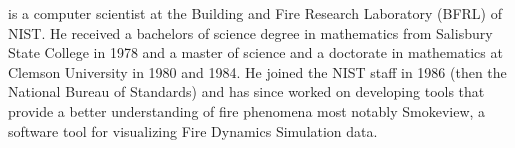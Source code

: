 \item[Glenn Forney] is a computer scientist at the Building and Fire Research Laboratory (BFRL) of NIST. He received a bachelors of science degree in mathematics from
 Salisbury State College in 1978 and a master of science and a doctorate in mathematics at Clemson University in 1980 and 1984.  He joined the NIST staff in 1986 (then the National Bureau of Standards) and has since worked on developing tools that provide a better understanding of fire phenomena most notably Smokeview, a software tool for visualizing Fire Dynamics Simulation data.
